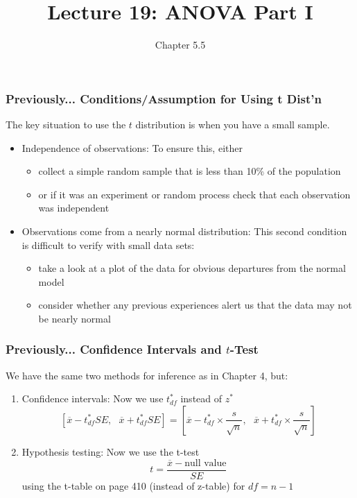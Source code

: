 \documentclass[handout]{beamer}
\title{Lecture 19: ANOVA Part I}
\author{Chapter 5.5}
\date{}
\newcommand{\blue}[1]{\textcolor{blue2}{#1}}
\newcommand{\xbar}{\overline{x}}
\begin{document}
\begin{frame}
\titlepage
\end{frame}


\begin{frame}
\frametitle{Previously... Conditions/Assumption for Using t Dist'n}
The key situation to use the $t$ distribution is when you have a \blue{small sample}.

\begin{itemize}
\item \blue{Independence of observations}: To ensure this, either
\begin{itemize}
\item collect a simple random sample that is less than 10\% of the population
\item or if it was an experiment or random process check that each observation was independent
\end{itemize}
\item \blue{Observations come from a nearly normal distribution}:  This second condition is difficult to verify with small data sets:
\begin{itemize}
\item take a look at a plot of the data for obvious departures from the normal model
\item consider whether any previous experiences alert us that the data may not be nearly normal
\end{itemize}
\end{itemize}  	
\end{frame}



\begin{frame}
\frametitle{Previously... Confidence Intervals and $t$-Test}

We have the same two methods for inference as in Chapter 4, but:
\begin{enumerate}
\item Confidence intervals:  Now we use $t^*_{df}$ instead of $z^*$
\[
\left[\xbar - t_{df}^* SE, \mbox{  }\xbar + t_{df}^* SE\right] = 
\left[
\overline{x} - t_{df}^* \times\frac{s}{\sqrt n}, \mbox{  }
\overline{x} + t_{df}^* \times\frac{s}{\sqrt n}
\right]
\]
\item Hypothesis testing:  Now we use the \blue{t-test}
\[
t = \frac{\overline{x}-\mbox{null value}}{SE}
\]
using the t-table on page 410 (instead of z-table) for $df=n-1$
\end{enumerate}

\end{frame}
\end{document}
